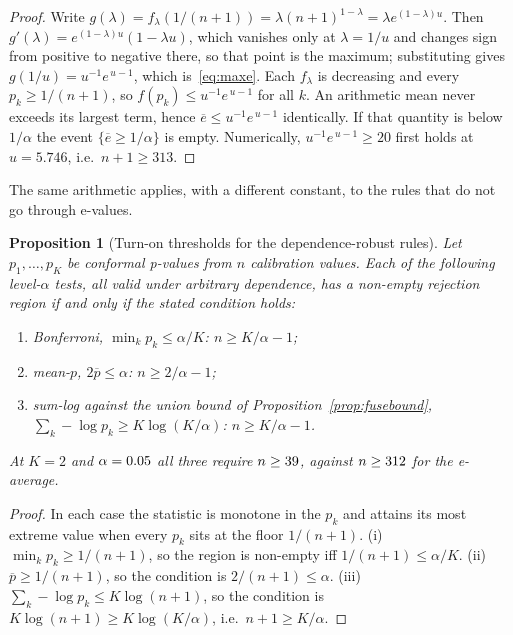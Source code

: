 \documentclass[pdflatex,sn-basic]{sn-jnl}%
\theoremstyle{thmstyleone}
\newtheorem{proposition}[theorem]{Proposition}
\theoremstyle{thmstyletwo}
\theoremstyle{thmstylethree}
\begin{document}
\begin{proof}
Write $g(\lambda) = f_\lambda(1/(n{+}1)) = \lambda (n{+}1)^{1-\lambda} = \lambda
e^{(1-\lambda)u}$. Then $g'(\lambda) = e^{(1-\lambda)u}(1 - \lambda u)$, which
vanishes only at $\lambda = 1/u$ and changes sign from positive to negative there,
so that point is the maximum; substituting gives $g(1/u) = u^{-1}e^{\,u-1}$, which
is~\eqref{eq:maxe}. Each $f_\lambda$ is decreasing and every $p_k \ge 1/(n{+}1)$,
so $f(p_k) \le u^{-1}e^{\,u-1}$ for all $k$. An arithmetic mean never exceeds its
largest term, hence $\overline{e} \le u^{-1}e^{\,u-1}$ identically. If that
quantity is below $1/\alpha$ the event $\{\overline{e} \ge 1/\alpha\}$ is empty.
Numerically, $u^{-1}e^{\,u-1} \ge 20$ first holds at $u = 5.746$, i.e.\
$n + 1 \ge 313$.
\end{proof}

The same arithmetic applies, with a different constant, to the rules that do not
go through e-values.

\begin{proposition}[Turn-on thresholds for the dependence-robust rules]
\label{prop:turnon}
Let $p_1,\dots,p_K$ be conformal p-values from $n$ calibration values. Each of the
following level-$\alpha$ tests, all valid under arbitrary dependence, has a
non-empty rejection region if and only if the stated condition holds:
\begin{enumerate}[label=(\roman*)]
\item Bonferroni, $\min_k p_k \le \alpha/K$: \quad $n \ge K/\alpha - 1$;
\item mean-$p$, $2\overline{p} \le \alpha$: \quad $n \ge 2/\alpha - 1$;
\item sum-log against the union bound of Proposition~\ref{prop:fusebound},
$\sum_k -\log p_k \ge K\log(K/\alpha)$: \quad $n \ge K/\alpha - 1$.
\end{enumerate}
At $K = 2$ and $\alpha = 0.05$ all three require $n \ge 39$, against
$n \ge 312$ for the e-average.
\end{proposition}

\begin{proof}
In each case the statistic is monotone in the $p_k$ and attains its most extreme
value when every $p_k$ sits at the floor $1/(n{+}1)$. (i) $\min_k p_k \ge
1/(n{+}1)$, so the region is non-empty iff $1/(n{+}1) \le \alpha/K$. (ii)
$\overline{p} \ge 1/(n{+}1)$, so the condition is $2/(n{+}1) \le \alpha$. (iii)
$\sum_k -\log p_k \le K\log(n{+}1)$, so the condition is $K\log(n{+}1) \ge
K\log(K/\alpha)$, i.e.\ $n + 1 \ge K/\alpha$.
\end{proof}
\end{document}
